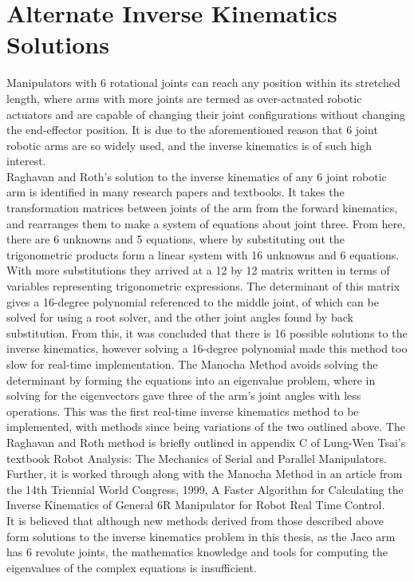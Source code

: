 \documentclass[12pt,openany,a4paper]{book}
\begin{document}
{\section{Alternate Inverse Kinematics Solutions}

Manipulators with 6 rotational joints can reach any position within its stretched length, where arms with more joints are termed as over-actuated robotic actuators and are capable of changing their joint configurations without changing the end-effector position. It is due to the aforementioned reason that 6 joint robotic arms are so widely used, and the inverse kinematics is of such high interest.\\
Raghavan and Roth's solution to the inverse kinematics of any 6 joint robotic arm is identified in many research papers and textbooks. It takes the transformation matrices between joints of the arm from the forward kinematics, and rearranges them to make a system of equations about joint three. From here, there are 6 unknowns and 5 equations, where by substituting out the trigonometric products form a linear system with 16 unknowns and 6 equations. With more substitutions they arrived at a 12 by 12 matrix written in terms of variables representing trigonometric expressions. The determinant of this matrix gives a 16-degree polynomial referenced to the middle joint, of which can be solved for using a root solver, and the other joint angles found by back substitution. From this, it was concluded that there is 16 possible solutions to the inverse kinematics, however solving a 16-degree polynomial made this method too slow for real-time implementation. The Manocha Method avoids solving the determinant by forming the equations into an eigenvalue problem, where in solving for the eigenvectors gave three of the arm's joint angles with less operations. This was the first real-time inverse kinematics method to be implemented, with methods since being variations of the two outlined above. The Raghavan and Roth method is briefly outlined in appendix C of Lung-Wen Tsai's textbook Robot Analysis: The Mechanics of Serial and Parallel Manipulators. Further, it is worked through along with the Manocha Method in an article from the 14th Triennial World Congress, 1999, A Faster Algorithm for Calculating the Inverse Kinematics of General 6R Manipulator for Robot Real Time Control.\\
It is believed that although new methods derived from those described above form solutions to the inverse kinematics problem in this thesis, as the Jaco arm has 6 revolute joints, the mathematics knowledge and tools for computing the eigenvalues of the complex equations is insufficient.\\

}
\end{document}
